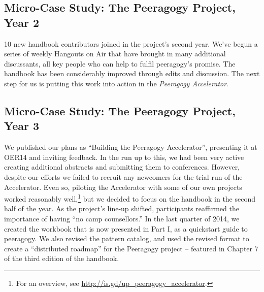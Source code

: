 \hypertarget{micro-case-study-the-peeragogy-project-year-2}{%
\subsection{\texorpdfstring{{Micro-}Case Study: The Peeragogy Project,
Year
2}{Micro-Case Study: The Peeragogy Project, Year 2}}\label{micro-case-study-the-peeragogy-project-year-2}}

10 new handbook contributors joined in the project's second year. We've
begun a series of weekly Hangouts on Air that have brought in many
additional discussants, all key people who can help to fulfil
peeragogy's promise. The handbook has been considerably improved through
edits and discussion. The next step for us is putting this work into
action in the \emph{Peeragogy Accelerator}.

\hypertarget{micro-case-study-the-peeragogy-project-year-3}{%
\subsection{\texorpdfstring{{Micro-}Case Study: The Peeragogy Project,
Year
3}{Micro-Case Study: The Peeragogy Project, Year 3}}\label{micro-case-study-the-peeragogy-project-year-3}}

We published our plans as ``Building the Peeragogy Accelerator'',
presenting it at OER14 and inviting feedback. In the run up to this, we
had been very active creating additional abstracts and submitting them
to conferences. However, despite our efforts we failed to recruit any
newcomers for the trial run of the Accelerator. Even so, piloting the
Accelerator with some of our own projects worked reasonably
well,\footnote{For an overview, see
  \url{http://is.gd/up_peeragogy_accelerator}.} but we decided to focus
on the handbook in the second half of the year. As the project's line-up
shifted, participants reaffirmed the importance of having ``no camp
counsellors.'' In the last quarter of 2014, we created the workbook that
is now presented in Part I, as a quickstart guide to peeragogy. We also
revised the pattern catalog, and used the revised format to create a
``distributed roadmap'' for the Peeragogy project -- featured in Chapter
7 of the third edition of the handbook.
